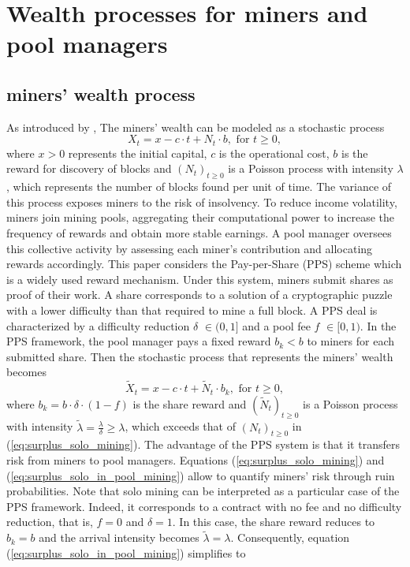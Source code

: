 \section{Wealth processes for miners and pool managers}\label{sec:mining_pool}
\subsection{miners' wealth process}\label{sec:sub_mining_pool}
As introduced by \cite{hansjoerg2022profitability}, The miners' wealth can be modeled as a stochastic process
\begin{equation}\label{eq:surplus_solo_mining}
X_t = x -c\cdot t + N_t\cdot b,\text{ for } t\geq 0,
\end{equation}
where $x>0$ represents the initial capital, $c$ is the operational cost, $b$ is the reward for discovery of blocks and $(N_t)_{t\geq0}$ is a Poisson process with intensity $\lambda$, which represents the number of blocks found per unit of time. The variance of this process exposes miners to the risk of insolvency. To reduce income volatility, miners join mining pools, aggregating their computational power to increase the frequency of rewards and obtain more stable earnings. A pool manager oversees this collective activity by assessing each miner’s contribution and allocating rewards accordingly. This paper considers the Pay-per-Share (PPS) scheme which is a widely used reward mechanism. Under this system, miners submit shares as proof of their work. A share corresponds to a solution of a cryptographic puzzle with a lower difficulty than that required to mine a full block. A PPS deal is characterized by a difficulty reduction $\delta$ $\in(0,1]$ and a pool fee $f$ $\in[0,1)$. In the PPS framework, the pool manager pays a fixed reward $b_k<b$ to miners for each submitted share. Then the stochastic process that represents the miners' wealth becomes
\begin{equation}\label{eq:surplus_solo_in_pool_mining}
\tilde{X}_t = x -c\cdot t + \tilde{N}_t\cdot b_k,\text{ for } t\geq 0,
\end{equation}
where $b_k=b\cdot\delta\cdot(1-f)$ is the share reward and $(\tilde{N}_t)_{t\geq0}$ is a Poisson process with intensity $\tilde{\lambda}=\frac{\lambda}{\delta}\geq\lambda$, which exceeds that of $(N_t)_{t\geq0}$ in (\ref{eq:surplus_solo_mining}). The advantage of the PPS system is that it transfers risk from miners to pool managers. Equations (\ref{eq:surplus_solo_mining}) and (\ref{eq:surplus_solo_in_pool_mining}) allow \citet{albrecher2022blockchain} to quantify miners’ risk through ruin probabilities. Note that solo mining can be interpreted as a particular case of the PPS framework. Indeed, it corresponds to a contract with no fee and no difficulty reduction, that is, $f = 0$ and $\delta = 1$. In this case, the share reward reduces to $b_k = b$ and the arrival intensity becomes $\tilde{\lambda} = \lambda$. Consequently, equation (\ref{eq:surplus_solo_in_pool_mining}) simplifies to
